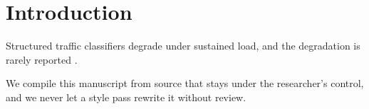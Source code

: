 \section{Introduction}
\label{sec:intro}

Structured traffic classifiers degrade under sustained load, and the degradation is
rarely reported \cite{kraus2019}.

We compile this manuscript from source that stays under the researcher's control, and
we never let a style pass rewrite it without review.
